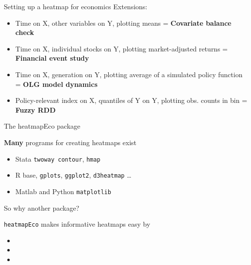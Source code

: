 \begin{frame}{Setting up a heatmap for economics}
        Extensions:
        \begin{itemize}
                \item<1-> Time on X, other variables on Y, plotting means \newline = \textbf{Covariate balance check}
                \item<2-> Time on X, individual stocks on Y, plotting market-adjusted returns \newline = \textbf{Financial event study}
                \item<3-> Time on X, generation on Y, plotting average of a simulated policy function \newline = \textbf{OLG model dynamics}
                \item<4-> Policy-relevant index on X, quantiles of Y on Y, plotting obs. counts in bin \newline = \textbf{Fuzzy RDD}
        \end{itemize}
\end{frame}

{
}

\begin{frame}{The heatmapEco package}
    \begin{itemize}
            \item<1-> \textbf{Many} programs for creating heatmaps exist
                    \begin{itemize}
                            \item<2-> Stata \texttt{twoway contour}, \texttt{hmap}
                            \item<2-> R base, \texttt{gplots}, \texttt{ggplot2}, \texttt{d3heatmap} \ldots
                            \item<2-> Matlab and Python \texttt{matplotlib}
                    \end{itemize}
                    So why another package?
             {\item\texttt{heatmapEco} makes informative heatmaps easy by
                    \begin{itemize}
                            \item {}
                            \item {}
                            \item {}
                    \end{itemize}}
    \end{itemize}
\end{frame}

